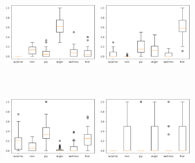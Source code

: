 \documentclass[acmtog]{acmart}
\begin{document}
\begin{figure}[h]
  \begin{minipage}{.33\textwidth}
    \centering
    \includegraphics[width=5cm,height=5cm,keepaspectratio]{download.pdf}
  \end{minipage}%
  \begin{minipage}{.33\textwidth}
    \centering
    \includegraphics[width=5cm,height=5cm,keepaspectratio]{fear_wie.pdf}
  \end{minipage}%
  \begin{minipage}{.33\textwidth}
    \centering
    \includegraphics[width=5cm,height=5cm,keepaspectratio]{joy.pdf}
  \end{minipage}
 \medskip
  \begin{minipage}{.33\textwidth}
    \centering
    \includegraphics[width=5cm,height=5cm,keepaspectratio]{love_wie.pdf}

\end{minipage}
\end{figure}
\end{document}

